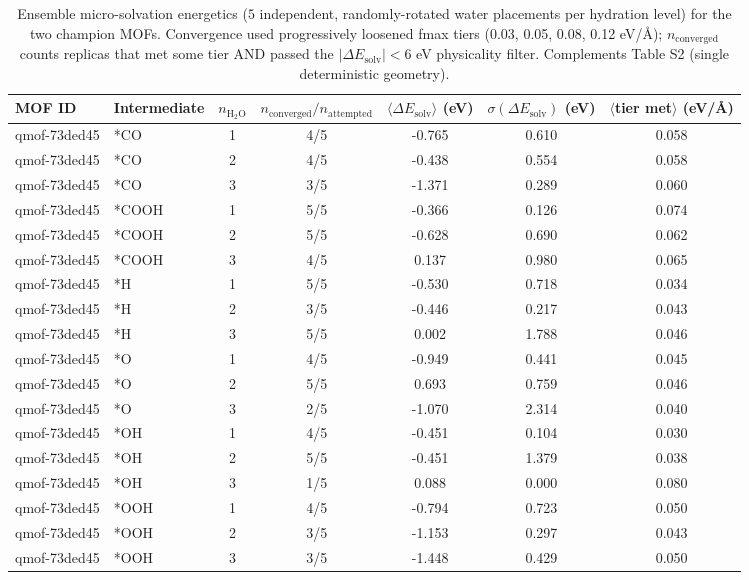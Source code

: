 \begin{table}[t]
\centering
\small
\caption{Ensemble micro-solvation energetics ($5$ independent, randomly-rotated water placements per hydration level) for the two champion MOFs. Convergence used progressively loosened fmax tiers (0.03, 0.05, 0.08, 0.12 eV/\AA); $n_{\mathrm{converged}}$ counts replicas that met some tier AND passed the $|\Delta E_{\mathrm{solv}}|<6$ eV physicality filter. Complements Table S2 (single deterministic geometry).}
\label{tab:microsolvation_ensemble}
\begin{tabular}{llccccc}
\hline\hline
MOF ID & Intermediate & $n_{\mathrm{H_2O}}$ & $n_{\mathrm{converged}}/n_{\mathrm{attempted}}$ & $\langle\Delta E_{\mathrm{solv}}\rangle$ (eV) & $\sigma(\Delta E_{\mathrm{solv}})$ (eV) & $\langle$tier met$\rangle$ (eV/\AA) \\
\hline
qmof-73ded45 & *CO & 1 & 4/5 & -0.765 & 0.610 & 0.058 \\
qmof-73ded45 & *CO & 2 & 4/5 & -0.438 & 0.554 & 0.058 \\
qmof-73ded45 & *CO & 3 & 3/5 & -1.371 & 0.289 & 0.060 \\
qmof-73ded45 & *COOH & 1 & 5/5 & -0.366 & 0.126 & 0.074 \\
qmof-73ded45 & *COOH & 2 & 5/5 & -0.628 & 0.690 & 0.062 \\
qmof-73ded45 & *COOH & 3 & 4/5 & 0.137 & 0.980 & 0.065 \\
qmof-73ded45 & *H & 1 & 5/5 & -0.530 & 0.718 & 0.034 \\
qmof-73ded45 & *H & 2 & 3/5 & -0.446 & 0.217 & 0.043 \\
qmof-73ded45 & *H & 3 & 5/5 & 0.002 & 1.788 & 0.046 \\
qmof-73ded45 & *O & 1 & 4/5 & -0.949 & 0.441 & 0.045 \\
qmof-73ded45 & *O & 2 & 5/5 & 0.693 & 0.759 & 0.046 \\
qmof-73ded45 & *O & 3 & 2/5 & -1.070 & 2.314 & 0.040 \\
qmof-73ded45 & *OH & 1 & 4/5 & -0.451 & 0.104 & 0.030 \\
qmof-73ded45 & *OH & 2 & 5/5 & -0.451 & 1.379 & 0.038 \\
qmof-73ded45 & *OH & 3 & 1/5 & 0.088 & 0.000 & 0.080 \\
qmof-73ded45 & *OOH & 1 & 4/5 & -0.794 & 0.723 & 0.050 \\
qmof-73ded45 & *OOH & 2 & 3/5 & -1.153 & 0.297 & 0.043 \\
qmof-73ded45 & *OOH & 3 & 3/5 & -1.448 & 0.429 & 0.050 \\

\end{tabular}
\end{table}
